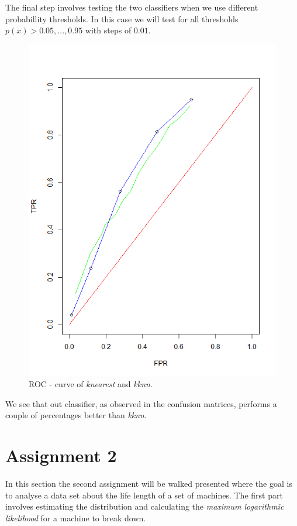 \documentclass[a4paper,12pt]{article}
\begin{document}
The final step involves testing the two classifiers when we use different probabillity thresholds. In this case we will test for all thresholds \( p(x) > 0.05,...,0.95\) with steps of \(0.01\).
\begin{figure}[H]
\centering
\begin{minipage}[]{0.5\textwidth}
  \includegraphics[width=\textwidth]{figures/Lab1_A1_ROC.png}  
  \caption{ROC - curve of  \textit{knearest} and  \textit{kknn}.\label{fig:ROC - curve} }
 \end{minipage}
\end{figure}
We see that out classifier, as observed in the confusion matrices, performs a couple of percentages better than \textit{kknn}.


\section{Assignment 2}

In this section the second assignment will be walked presented where the goal is to analyse a data set about the life length of a set of machines. The first part involves estimating the distribution and calculating the \textit{maximum logarithmic likelihood} for a machine to break down. 
\end{document}
